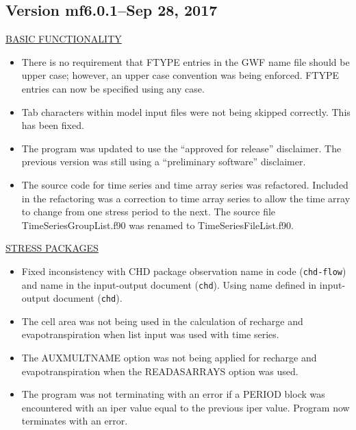 	
	\subsection{Version mf6.0.1--Sep 28, 2017}
	
	\underline{BASIC FUNCTIONALITY}
	\begin{itemize}
		\item There is no requirement that FTYPE entries in the GWF name file should be upper case; however, an upper case convention was being enforced.  FTYPE entries can now be specified using any case.
		\item Tab characters within model input files were not being skipped correctly.  This has been fixed.
		\item The program was updated to use the ``approved for release'' disclaimer.  The previous version was still using a ``preliminary software'' disclaimer.
		\item The source code for time series and time array series was refactored.  Included in the refactoring was a correction to time array series to allow the time array to change from one stress period to the next.  The source file TimeSeriesGroupList.f90 was renamed to TimeSeriesFileList.f90.
	\end{itemize}
	
	\underline{STRESS PACKAGES}
	\begin{itemize}
		\item Fixed inconsistency with CHD package observation name in code (\texttt{chd-flow}) and name in the input-output document (\texttt{chd}). Using name defined in input-output document (\texttt{chd}).
		\item The cell area was not being used in the calculation of recharge and evapotranspiration when list input was used with time series.
		\item The AUXMULTNAME option was not being applied for recharge and evapotranspiration when the READASARRAYS option was used.
		\item The program was not terminating with an error if a PERIOD block was encountered with an iper value equal to the previous iper value.  Program now terminates with an error.
	\end{itemize}
	
